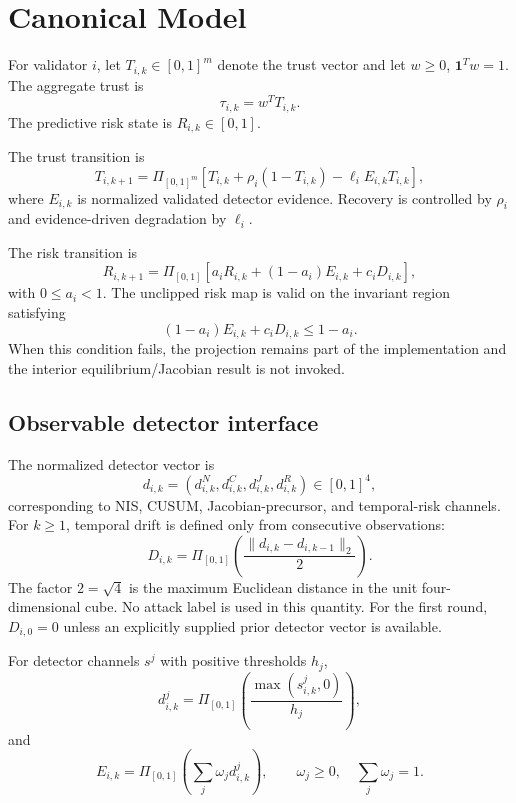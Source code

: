 \documentclass[10pt,journal]{IEEEtran}
\begin{document}
\section{Canonical Model}
For validator $i$, let $T_{i,k}\in[0,1]^m$ denote the trust vector and let $w\ge0$, $\mathbf{1}^Tw=1$. The aggregate trust is
\begin{equation}
\tau_{i,k}=w^TT_{i,k}.
\end{equation}
The predictive risk state is $R_{i,k}\in[0,1]$.

The trust transition is
\begin{equation}
T_{i,k+1}=\Pi_{[0,1]^m}\left[T_{i,k}+\rho_i(1-T_{i,k})-\ell_iE_{i,k}T_{i,k}\right],
\end{equation}
where $E_{i,k}$ is normalized validated detector evidence. Recovery is controlled by $\rho_i$ and evidence-driven degradation by $\ell_i$.

The risk transition is
\begin{equation}
R_{i,k+1}=\Pi_{[0,1]}\left[a_iR_{i,k}+(1-a_i)E_{i,k}+c_iD_{i,k}\right],
\end{equation}
with $0\le a_i<1$. The unclipped risk map is valid on the invariant region satisfying
\begin{equation}
(1-a_i)E_{i,k}+c_iD_{i,k}\le1-a_i.
\end{equation}
When this condition fails, the projection remains part of the implementation and the interior equilibrium/Jacobian result is not invoked.

\subsection{Observable detector interface}
The normalized detector vector is
\begin{equation}
d_{i,k}=(d^N_{i,k},d^C_{i,k},d^J_{i,k},d^R_{i,k})\in[0,1]^4,
\end{equation}
corresponding to NIS, CUSUM, Jacobian-precursor, and temporal-risk channels. For $k\ge1$, temporal drift is defined only from consecutive observations:
\begin{equation}
D_{i,k}=\Pi_{[0,1]}\left(\frac{\|d_{i,k}-d_{i,k-1}\|_2}{2}\right).
\end{equation}
The factor $2=\sqrt{4}$ is the maximum Euclidean distance in the unit four-dimensional cube. No attack label is used in this quantity. For the first round, $D_{i,0}=0$ unless an explicitly supplied prior detector vector is available.

For detector channels $s^j$ with positive thresholds $h_j$,
\begin{equation}
d^j_{i,k}=\Pi_{[0,1]}\left(\frac{\max(s^j_{i,k},0)}{h_j}\right),
\end{equation}
and
\begin{equation}
E_{i,k}=\Pi_{[0,1]}\left(\sum_j\omega_jd^j_{i,k}\right),\qquad \omega_j\ge0,\quad\sum_j\omega_j=1.
\end{equation}
\end{document}
